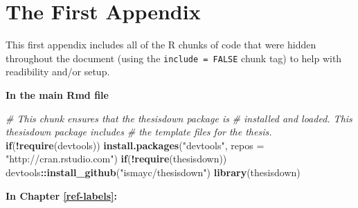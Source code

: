\documentclass[12pt,twoside]{reedthesis}
\newenvironment{Shaded}{\begin{snugshade}}{\end{snugshade}}
\newcommand{\CommentTok}[1]{\textcolor[rgb]{0.56,0.35,0.01}{\textit{#1}}}
\newcommand{\ControlFlowTok}[1]{\textcolor[rgb]{0.13,0.29,0.53}{\textbf{#1}}}
\newcommand{\DataTypeTok}[1]{\textcolor[rgb]{0.13,0.29,0.53}{#1}}
\newcommand{\KeywordTok}[1]{\textcolor[rgb]{0.13,0.29,0.53}{\textbf{#1}}}
\newcommand{\NormalTok}[1]{#1}
\newcommand{\OperatorTok}[1]{\textcolor[rgb]{0.81,0.36,0.00}{\textbf{#1}}}
\newcommand{\StringTok}[1]{\textcolor[rgb]{0.31,0.60,0.02}{#1}}
\theoremstyle{definition}
\theoremstyle{definition}
\theoremstyle{definition}
\theoremstyle{remark}
\begin{document}
\appendix

\hypertarget{the-first-appendix}{%
\chapter{The First Appendix}\label{the-first-appendix}}

This first appendix includes all of the R chunks of code that were
hidden throughout the document (using the \texttt{include\ =\ FALSE}
chunk tag) to help with readibility and/or setup.

\textbf{In the main Rmd file}
\begin{Shaded}
\begin{Highlighting}[]
\CommentTok{# This chunk ensures that the thesisdown package is}
\CommentTok{# installed and loaded. This thesisdown package includes}
\CommentTok{# the template files for the thesis.}
\ControlFlowTok{if}\NormalTok{(}\OperatorTok{!}\KeywordTok{require}\NormalTok{(devtools))}
  \KeywordTok{install.packages}\NormalTok{(}\StringTok{"devtools"}\NormalTok{, }\DataTypeTok{repos =} \StringTok{"http://cran.rstudio.com"}\NormalTok{)}
\ControlFlowTok{if}\NormalTok{(}\OperatorTok{!}\KeywordTok{require}\NormalTok{(thesisdown))}
\NormalTok{  devtools}\OperatorTok{::}\KeywordTok{install_github}\NormalTok{(}\StringTok{"ismayc/thesisdown"}\NormalTok{)}
\KeywordTok{library}\NormalTok{(thesisdown)}
\end{Highlighting}
\end{Shaded}
\textbf{In Chapter \ref{ref-labels}:}
\end{document}

